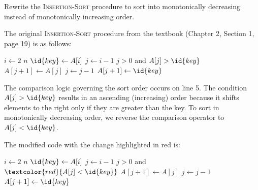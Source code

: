 \item[\textbf{Exercise 2.1-3}]
Rewrite the \textsc{Insertion-Sort} procedure to sort into monotonically
decreasing instead of monotonically increasing order.

\Solution

The original \textsc{Insertion-Sort} procedure from the textbook (Chapter 2,
Section 1, page 19) is as follows:

\begin{codebox}
\li \For $i \gets 2$ \To $n$ \Do
\li     $\id{key} \gets A[i]$
\li     {}
\li     $j \gets i - 1$
\li     \While $j > 0$ and $A[j] > \id{key}$ \Do
\li         $A[j + 1] \gets A[j]$
\li         $j \gets j - 1$
        \End
\li     $A[j + 1] \gets \id{key}$
    \End
\end{codebox}

The comparison logic governing the sort order occurs on line 5. The condition
$A[j] > \id{key}$ results in an ascending (increasing) order because it shifts
elements to the right only if they are greater than the key. To sort in
monotonically decreasing order, we reverse the comparison operator to
$A[j] < \id{key}$.

The modified code with the change highlighted in red is:

\begin{codebox}
\li \For $i \gets 2$ \To $n$ \Do
\li     $\id{key} \gets A[i]$
\li     {}
\li     $j \gets i - 1$
\li     \While $j > 0$ and $\textcolor{red}{A[j] < \id{key}}$ \Do
\li         $A[j + 1] \gets A[j]$
\li         $j \gets j - 1$
        \End
\li     $A[j + 1] \gets \id{key}$
    \End
\end{codebox}
